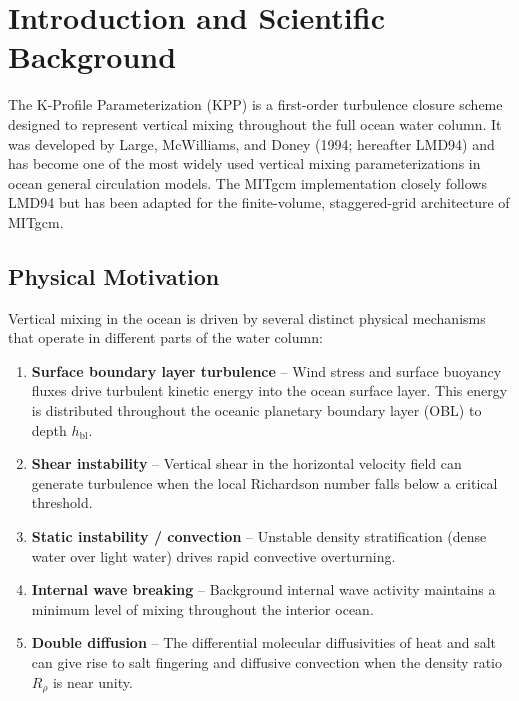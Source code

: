 \documentclass[12pt,letterpaper]{article}
\newcommand{\hbl}{h_{\mathrm{bl}}}
\begin{document}
\section{Introduction and Scientific Background}  
  
The K-Profile Parameterization (KPP) is a first-order turbulence closure  
scheme designed to represent vertical mixing throughout the full ocean  
water column. It was developed by Large, McWilliams, and Doney (1994;  
hereafter LMD94) and has become one of the most widely used vertical  
mixing parameterizations in ocean general circulation models. The MITgcm  
implementation closely follows LMD94 but has been adapted for the  
finite-volume, staggered-grid architecture of MITgcm.  
  
\subsection{Physical Motivation}  
  
Vertical mixing in the ocean is driven by several distinct physical  
mechanisms that operate in different parts of the water column:  
  
\begin{enumerate}[leftmargin=*, label=\textbf{\arabic*.}]  
  \item \textbf{Surface boundary layer turbulence} -- Wind stress and  
        surface buoyancy fluxes drive turbulent kinetic energy into the  
        ocean surface layer. This energy is distributed throughout the  
        oceanic planetary boundary layer (OBL) to depth $\hbl$.  
  
  \item \textbf{Shear instability} -- Vertical shear in the horizontal  
        velocity field can generate turbulence when the local Richardson  
        number falls below a critical threshold.  
  
  \item \textbf{Static instability / convection} -- Unstable density  
        stratification (dense water over light water) drives rapid  
        convective overturning.  
  
  \item \textbf{Internal wave breaking} -- Background internal wave  
        activity maintains a minimum level of mixing throughout the  
        interior ocean.  
  
  \item \textbf{Double diffusion} -- The differential molecular  
        diffusivities of heat and salt can give rise to salt fingering  
        and diffusive convection when the density ratio $R_\rho$ is near  
        unity.  
\end{enumerate}  
  
\end{document}
